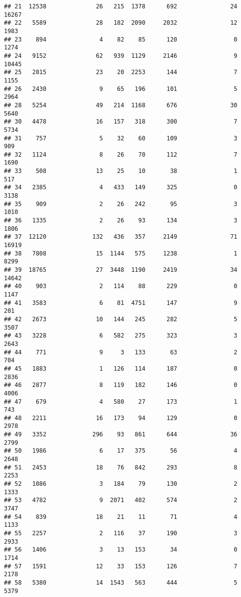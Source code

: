 \documentclass[
]{article}
\begin{document}
\begin{verbatim}
## 21  12538              26   215  1378      692               24 16267
## 22   5589              28   182  2090     2032               12  1983
## 23    894               4    82    85      120                0  1274
## 24   9152              62   939  1129     2146                9 10445
## 25   2815              23    20  2253      144                7  1155
## 26   2430               9    65   196      101                5  2964
## 28   5254              49   214  1168      676               30  5640
## 30   4478              16   157   318      300                7  5734
## 31    757               5    32    60      109                3   909
## 32   1124               8    26    70      112                7  1690
## 33    508              13    25    10       38                1   517
## 34   2385               4   433   149      325                0  3138
## 35    909               2    26   242       95                3  1010
## 36   1335               2    26    93      134                3  1806
## 37  12120             132   436   357     2149               71 16919
## 38   7808              15  1144   575     1238                1  8299
## 39  18765              27  3448  1190     2419               34 14642
## 40    903               2   114    88      229                0  1147
## 41   3583               6    81  4751      147                9   201
## 42   2673              10   144   245      282                5  3507
## 43   3228               6   582   275      323                3  2643
## 44    771               9     3   133       63                2   704
## 45   1883               1   126   114      187                0  2836
## 46   2877               8   119   182      146                0  4006
## 47    679               4   580    27      173                1   743
## 48   2211              16   173    94      129                0  2978
## 49   3352             296    93   861      644               36  2799
## 50   1986               6    17   375       56                4  2648
## 51   2453              18    76   842      293                8  2253
## 52   1086               3   184    79      130                2  1333
## 53   4782               9  2071   402      574                2  3747
## 54    839              18    21    11       71                4  1133
## 55   2257               2   116    37      190                3  2933
## 56   1406               3    13   153       34                0  1714
## 57   1591              12    33   153      126                7  2178
## 58   5380              14  1543   563      444                5  5379

\end{verbatim}
\end{document}
